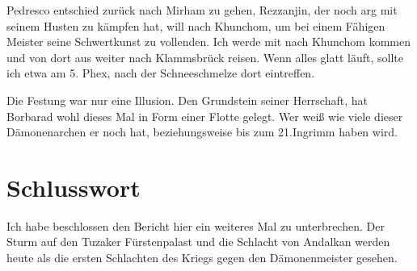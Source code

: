 Pedresco entschied zurück nach Mirham zu gehen, Rezzanjin, der noch arg mit seinem Husten zu kämpfen hat, will nach Khunchom, um bei einem Fähigen Meister seine Schwertkunst zu vollenden.
Ich werde mit nach Khunchom kommen und von dort aus weiter nach Klammsbrück reisen. Wenn alles glatt läuft, sollte ich etwa am 5. Phex, nach der Schneeschmelze dort eintreffen.

Die Festung war nur eine Illusion. Den Grundstein seiner Herrschaft, hat Borbarad wohl dieses Mal in Form einer Flotte gelegt. Wer weiß wie viele dieser Dämonenarchen er noch hat, beziehungsweise bis zum 21.Ingrimm haben wird.

\chapter{Schlusswort}

Ich habe beschlossen den Bericht hier ein weiteres Mal zu unterbrechen.
Der Sturm auf den Tuzaker Fürstenpalast und die Schlacht von Andalkan werden heute als die ersten Schlachten des Kriegs gegen den Dämonenmeister gesehen.